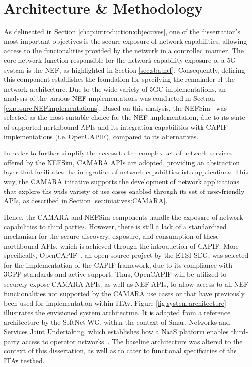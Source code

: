 \section{Architecture \& Methodology}
\label{chap:proposal:architecture}

As delineated in Section \ref{chap:introduction:objectives}, one of the dissertation's most important objectives is the secure exposure of network capabilities, allowing access to the funcionalities provided by the network in a controlled manner. The core network function responsible for the network capability exposure of a \acs{5G} system is the \acs{NEF}, as highlighted in Section \ref{sec:sba:nef}. Consequently, defining this component establishes the foundation for specifying the remainder of the network architecture. Due to the wide variety of \acs{5GC} implementations, an analysis of the various \acs{NEF} implementations was conducted in Section \ref{exposure:NEFimplementations}. Based on this analysis, the NEFSim~\cite{NEFSimMediaNetLabGithub} was selected as the most suitable choice for the \acs{NEF} implementation, due to its suite of supported northbound \acsp{API} and its integration capabilities with \acs{CAPIF} implementations (i.e. OpenCAPIF), compared to its alternatives.

In order to further simplify the access to the complex set of network services offered by the NEFSim, CAMARA \acsp{API} are adopted, providing an abstraction layer that facilitates the integration of network capabilities into applications. This way, the CAMARA initative supports the development of network applications that explore the wide variety of use cases enabled through its set of user-friendly \acsp{API}, as described in Section \ref{sec:iniatives:CAMARA}.

Hence, the CAMARA and NEFSim components handle the exposure of network capabilities to third parties. However, there is still a lack of a standardized mechanism for the secure discovery, exposure, and consumption of these northbound \acsp{API}, which is achieved through the introduction of \acs{CAPIF}. More specifically, OpenCAPIF~\cite{OpenCAPIF}, an open source project by the \acs{ETSI} \acs{SDG}, was selected for the implementation of the \acs{CAPIF} framework, due to its compliance with \acs{3GPP} standards and active support. Thus, OpenCAPIF will be utilized to securely expose CAMARA \acsp{API}, as well as \acs{NEF} \acsp{API}, to allow access to all NEF functionalities not supported by the CAMARA use cases or that have previously been used for implementation within \acs{ITAv}. Figure \ref{fig:system:architecture} illustrates the envisioned system architecture. It is adapted from a reference architecture by the SoftNet \acs{WG}, within the context of Smart Networks and Services Joint Undertaking, which establishes how a \acs{NaaS} platform enables third-party access to operator networks~\cite{SoftnetWhitePaperBaseArchitecture}. The baseline architecture was altered to the context of this dissertation, as well as to cater to functional specificities of the \acs{ITAv} testbed.


